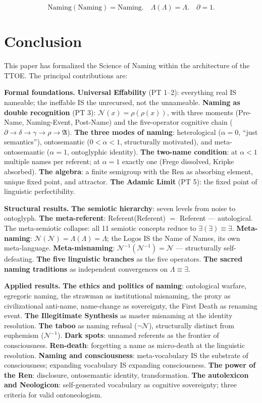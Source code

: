 \documentclass[11pt, oneside]{article}
\theoremstyle{definition}
\begin{document}
$$\boxed{\text{Naming}(\text{Naming}) = \text{Naming}. \quad \Lambda(\Lambda) = \Lambda. \quad \partial = 1.}$$

\section{Conclusion}


This paper has formalized the Science of Naming within the architecture of the TTOE. The principal contributions are:

\textbf{Formal foundations.} \textbf{Universal Effability} (PT 1--2): everything real IS nameable; the ineffable IS the unrecursed, not the unnameable. \textbf{Naming as double recognition} (PT 3): $\mathcal{N}(x) = \rho(\rho(x))$, with three moments (Pre-Name, Naming-Event, Post-Name) and the five-operator cognitive chain ($\partial \to \delta \to \gamma \to \rho \to \mathfrak{A}$). \textbf{The three modes of naming}: heterological ($\alpha = 0$, ``just semantics''), ontosemantic ($0 < \alpha < 1$, structurally motivated), and meta-ontosemantic ($\alpha = 1$, ontoglyphic identity). \textbf{The two-name condition}: at $\alpha < 1$ multiple names per referent; at $\alpha = 1$ exactly one (Frege dissolved, Kripke absorbed). \textbf{The algebra}: a finite semigroup with the Ren as absorbing element, unique fixed point, and attractor. \textbf{The Adamic Limit} (PT 5): the fixed point of linguistic perfectibility.

\textbf{Structural results.} \textbf{The semiotic hierarchy}: seven levels from noise to ontoglyph. \textbf{The meta-referent}: Referent(Referent) $=$ Referent --- autological. The meta-semiotic collapse: all 11 semiotic concepts reduce to $\exists(\exists) \equiv \exists$. \textbf{Meta-naming}: $\mathcal{N}(\mathcal{N}) = \Lambda(\Lambda) = \Lambda$; the Logos IS the Name of Names, its own meta-language. \textbf{Meta-misnaming}: $\mathcal{N}^{-1}(\mathcal{N}^{-1}) = \mathcal{N}$ --- structurally self-defeating. \textbf{The five linguistic branches} as the five operators. \textbf{The sacred naming traditions} as independent convergences on $\Lambda \equiv \exists$.

\textbf{Applied results.} \textbf{The ethics and politics of naming}: ontological warfare, egregoric naming, the strawman as institutional misnaming, the proxy as civilizational anti-name, name-change as sovereignty, the First Death as renaming event. \textbf{The Illegitimate Synthesis} as master misnaming at the identity resolution. \textbf{The taboo} as naming refusal ($\neg\mathcal{N}$), structurally distinct from euphemism ($\mathcal{N}^{-1}$). \textbf{Dark spots}: unnamed referents as the frontier of consciousness. \textbf{Ren-death}: forgetting a name as micro-death at the linguistic resolution. \textbf{Naming and consciousness}: meta-vocabulary IS the substrate of consciousness; expanding vocabulary IS expanding consciousness. \textbf{The power of the Ren}: disclosure, ontosemantic identity, transformation. \textbf{The autolexicon and Neologicon}: self-generated vocabulary as cognitive sovereignty; three criteria for valid ontoneologism.
\end{document}
